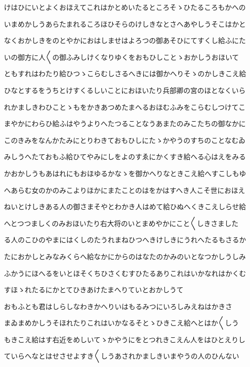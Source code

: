 \documentclass[a4paper,11pt,landscape]{ltjtarticle}
\begin{document}
けはひにいとよくおほえてこれはかとめいたるところそゝひたるころもかへの
\par\medskip
いまめかしうあらたまれるころほひそらのけしきなとさへあやしうそこはかと
\par\medskip
なくおかしきをのとやかにおはしませはよろつの御あそひにてすくし給ふにた
\par\medskip
いの御方に人〱の御ふみしけくなりゆくをおもひしことゝおかしうおほいて
\par\medskip
ともすれはわたり給ひつゝこらむしさるへきには御かへりそゝのかしきこえ給
\par\medskip
ひなとするをうちとけすくるしいことにおほいたり兵部卿の宮のほとなくいら
\par\medskip
れかましきわひことゝもをかきあつめたまへるおほむふみをこらむしつけてこ
\par\medskip
まやかにわらひ給ふはやうよりへたつることなうあまたのみこたちの御なかに
\par\medskip
このきみをなんかたみにとりわきておもひしにたゝかやうのすちのことなむゐ
\par\medskip
みしうへたておもふ給ひてやみにしをよのすゑにかくすき給へる心はえをみる
\par\medskip
かおかしうもあはれにもおほゆるかなゝを御かへりなときこえ給へすこしもゆ
\par\medskip
へあらむ女のかのみこよりほかにまたことのはをかはすへき人こそ世におほえ
\par\medskip
ねいとけしきある人の御さまそやとわかき人はめて給ひぬへくきこえしらせ給
\par\medskip
へとつつましくのみおほいたり右大将のいとまめやかにこと〱しきさました
\par\medskip
る人のこひのやまにはくしのたうれまねひつへきけしきにうれへたるもさるか
\par\medskip
たにおかしとみなみくらへ給なかにからのはなたのかみのいとなつかしうしみ
\par\medskip
ふかうにほへるをいとほそくちひさくむすひたるありこれはいかなれはかくむ
\par\medskip
すほゝれたるにかとてひきあけたまへりていとおかしうて
\par\medskip
おもふとも君はしらしなわきかへりいはもるみつにいろしみえねはかきさ
\par\medskip
まゐまめかしうそほれたりこれはいかなるそとゝひきこえ給へとはか〱しう
\par\medskip
もきこえ給はす右近をめしいてゝかやうにをとつれきこえん人をはひとえりし
\par\medskip
ていらへなとはせさせよすき〱しうあされかましきいまやうの人のひんない
\end{document}
